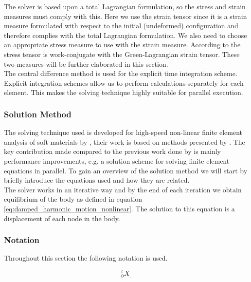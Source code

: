 The solver is based upon a total Lagrangian formulation, so the stress
and strain measures must comply with this. Here we use the
 strain tensor since it is a strain
measure formulated with respect to the initial (undeformed)
configuration and therefore complies with the total Lagrangian formulation.
We also need to choose an appropriate stress
measure to use with the strain measure. According to
 the  stress tensor
is work-conjugate with the Green-Lagrangian strain
tensor. These two measures will be further elaborated in
this section. \\

The central difference method is used for the explicit time
integration scheme. Explicit integration schemes allow us to perform
calculations separately for each element. This makes the 
solving technique highly suitable for parallel execution. 

\subsubsection{Solution Method}
The solving technique used is developed for high-speed non-linear finite
element analysis of soft materials by , their work
is based on methods 
presented by . The key contribution made
compared to the
previous work done by  is mainly performance
improvements, e.g. a solution scheme for
solving finite element equations in parallel. To gain an overview of
the solution method we will start by briefly introduce the
equations used and how they are related. \\

The solver works in an iterative way and by the end of each iteration
we obtain equilibrium of the body as defined in equation
\eqref{eq:damped_harmonic_motion_nonlinear}. The solution 
to this equation is a displacement of each node in the body. \\

\subsubsection*{Notation}
Throughout this section the following notation is used.

\begin{equation}
\label{eq:notation}
^t_0X_{\_}
\end{equation}

